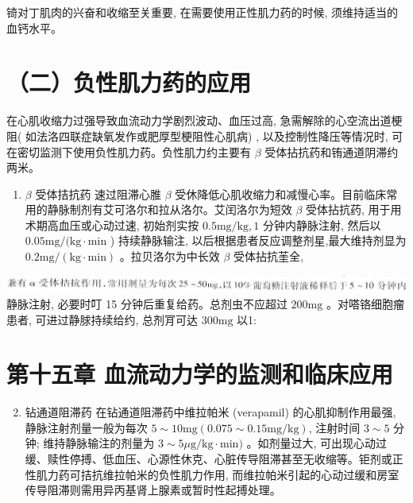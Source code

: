 \documentclass[10pt]{article}
\begin{document}
锜对丁肌肉的兴奋和收缩至关重要, 在需要使用正性肌力药的时候, 须维持适当的血钙水平。

\section*{（二）负性肌力药的应用}
在心肌收缩力过强导致血流动力学剧烈波动、血压过高, 急需解除的心空流出道梗阻( 如法洛四联症缺氧发作或肥厚型梗阻性心肌病) , 以及控制性降压等情况时, 可在密切监测下使用负性肌力药。负性肌力约主要有 $\beta$ 受体拈抗药和铕通道阴滞约两米。

\begin{enumerate}
  \item $\beta$ 受体拮抗药 速过阻滞心脽 $\beta$ 受休降低心肌收缩力和减慢心率。目前临床常用的静脉制剂有艾可洛尔和拉从洛尔。艾闰洛尔为短效 $\beta$ 受体拈抗药, 用于用术期高血压或心动过速, 初始剂实按 $0.5 \mathrm{mg} / \mathrm{kg}, 1$ 分钟内静脉注射, 然后以 $0.05 \mathrm{mg} /(\mathrm{kg} \cdot \mathrm{min}$ ) 持续静脉输注, 以后根据患者反应调整剂星,最大维持剂显为 $0.2 \mathrm{mg} /(\mathrm{kg} \cdot \mathrm{min})$ 。拉贝洛尔为中长效 $\beta$ 受体拈抗茥全,
\end{enumerate}

\includegraphics[max width=\textwidth, center]{2024_07_09_002a177993bd97d1d6d7g-166}\\
静脉注射, 必要时叮 15 分钟后重复给药。总剂虫不应超过 $200 \mathrm{mg}$ 。对嗒铬细胞瘤患者, 可进过静脙持续给约, 总剂肎可达 $300 \mathrm{mg}$ 以1:

\section*{第十五章 血流动力学的监测和临床应用}
\begin{enumerate}
  \setcounter{enumi}{1}
  \item 钻通道阻滞药 在钻通道阻滞药中维拉帕米 (verapamil) 的心肌抑制作用最强, 静脉注射剂量一般为每次 $5 \sim 10 \mathrm{mg}(0.075 \sim 0.15 \mathrm{mg} / \mathrm{kg})$, 注射时间 $3 \sim 5$ 分钟; 维持静脉输注的剂量为 $3 \sim 5 \mu \mathrm{g} / \mathrm{kg} \cdot \mathrm{min})$ 。如剂量过大, 可出现心动过缓、赎性停搏、低血压、心源性休克、心脏传导阻滞甚至无收缩等。钜剂或正性肌力药可拮抗维拉帕米的负性肌力作用, 而维拉帕米引起的心动过缓和房室传导阻滞则需用异丙基肾上腺素或暂时性起搏处理。
\end{enumerate}
\end{document}
